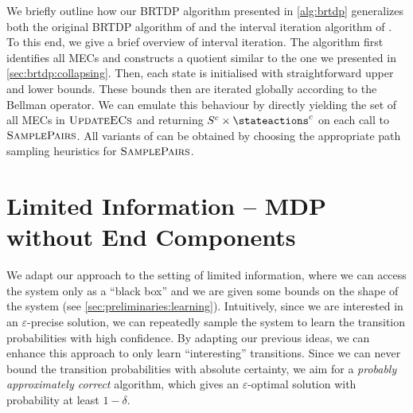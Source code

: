 \documentclass{theoretics}
\newcommand{\States}{S}
\newcommand{\samplepath}{\textsc{SamplePairs}}
\newcommand{\updateecs}{\textsc{UpdateECs}}
\begin{document}
We briefly outline how our BRTDP algorithm presented in \cref{alg:brtdp} generalizes both the original BRTDP algorithm of \cite{DBLP:conf/atva/BrazdilCCFKKPU14} and the interval iteration algorithm of \cite{DBLP:conf/rp/HaddadM14}.
To this end, we give a brief overview of interval iteration.
The algorithm first identifies all MECs and constructs a quotient similar to the one we presented in \cref{sec:brtdp:collapsing}.
Then, each state is initialised with straightforward upper and lower bounds.
These bounds then are iterated globally according to the Bellman operator.
We can emulate this behaviour by directly yielding the set of all MECs in $\updateecs$ and returning $\States^c \times \stateactions^c$ on each call to $\samplepath$.
All variants of \cite{DBLP:conf/atva/BrazdilCCFKKPU14} can be obtained by choosing the appropriate path sampling heuristics for $\samplepath$.
 	\section{Limited Information -- MDP without End Components} \label{sec:dql_no_ec}

We adapt our approach to the setting of limited information, where we can access the system only as a \enquote{black box} and we are given some bounds on the shape of the system (see \cref{sec:preliminaries:learning}).
Intuitively, since we are interested in an $\varepsilon$-precise solution, we can repeatedly sample the system to learn the transition probabilities with high confidence.
By adapting our previous ideas, we can enhance this approach to only learn \enquote{interesting} transitions.
Since we can never bound the transition probabilities with absolute certainty, we aim for a \emph{probably approximately correct} algorithm, which gives an $\varepsilon$-optimal solution with probability at least $1 - \delta$.
\end{document}

